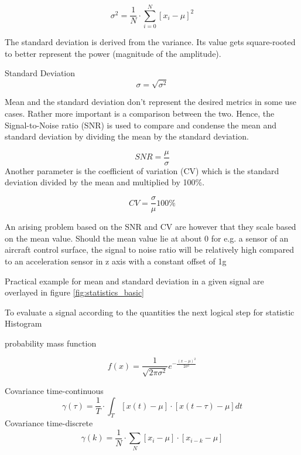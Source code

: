 \begin{equation}
    \label{eq:var_disc}
    \sigma^2=\frac{1}{N} \cdot \sum_{i=0}^{N}\left[x_i-\mu\right]^2
\end{equation}

The standard deviation is derived from the variance. Its value gets square-rooted to better represent the power (magnitude of the amplitude).

Standard Deviation
\begin{equation}
    \label{eq:stdev_disc}
    \sigma = \sqrt{\sigma^2}
\end{equation}

Mean and the standard deviation don't represent the desired metrics in some use cases. Rather more important is a comparison between the two. Hence, the Signal-to-Noise ratio (SNR) is used to compare and condense the mean and standard deviation by dividing the mean by the standard deviation.

\begin{equation}
    \label{eq:snr}
    SNR=\frac{\mu}{\sigma}
\end{equation}
Another parameter is the coefficient of variation (CV) which is the standard deviation divided by the mean and multiplied by 100\%.

\begin{equation}
    \label{eq:coeff_var}
    CV = \frac{\sigma}{\mu}100\%
\end{equation}

An arising problem based on the SNR and CV are however that they scale based on the mean value. Should the mean value lie at about 0 for e.g. a sensor of an aircraft control surface, the signal to noise ratio will be relatively high compared to an acceleration sensor in z axis with a constant offset of 1g

Practical example for mean and standard deviation in a given signal are overlayed in figure \ref{fig:statistics_basic}


To evaluate a signal according to the quantities the next logical step for statistic Histogram

probability mass function

\begin{equation}
    f(x)=\frac{1}{\sqrt{2 \pi \sigma^2}} e^{-\frac{(x-\mu)^2}{2 \sigma^2}}
\end{equation}


Covariance time-continuous
$$
\gamma(\tau)=\frac{1}{T} \cdot \int_T[x(t)-\mu] \cdot[x(t-\tau)-\mu] d t
$$
Covariance time-discrete
$$
\gamma(k)=\frac{1}{N} \cdot \sum_N\left[x_i-\mu\right] \cdot\left[x_{i-k}-\mu\right]
$$


